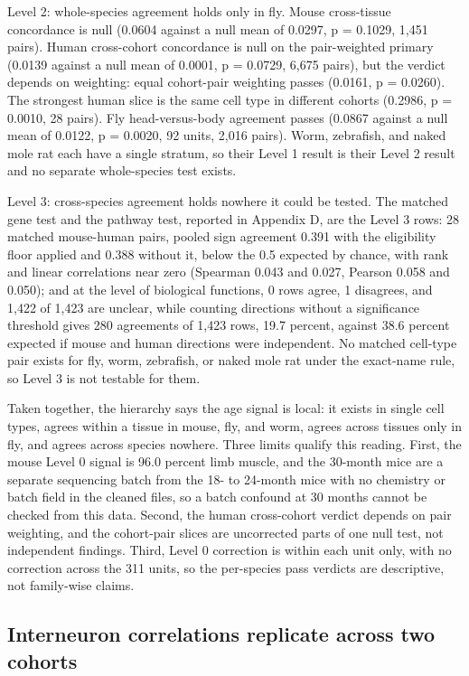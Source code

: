\documentclass[11pt]{article}
\begin{document}
Level 2: whole-species agreement holds only in fly. Mouse cross-tissue concordance is null (0.0604 against a null mean of 0.0297, p = 0.1029, 1,451 pairs). Human cross-cohort concordance is null on the pair-weighted primary (0.0139 against a null mean of 0.0001, p = 0.0729, 6,675 pairs), but the verdict depends on weighting: equal cohort-pair weighting passes (0.0161, p = 0.0260). The strongest human slice is the same cell type in different cohorts (0.2986, p = 0.0010, 28 pairs). Fly head-versus-body agreement passes (0.0867 against a null mean of 0.0122, p = 0.0020, 92 units, 2,016 pairs). Worm, zebrafish, and naked mole rat each have a single stratum, so their Level 1 result is their Level 2 result and no separate whole-species test exists.

Level 3: cross-species agreement holds nowhere it could be tested. The matched gene test and the pathway test, reported in Appendix D, are the Level 3 rows: 28 matched mouse-human pairs, pooled sign agreement 0.391 with the eligibility floor applied and 0.388 without it, below the 0.5 expected by chance, with rank and linear correlations near zero (Spearman 0.043 and 0.027, Pearson 0.058 and 0.050); and at the level of biological functions, 0 rows agree, 1 disagrees, and 1,422 of 1,423 are unclear, while counting directions without a significance threshold gives 280 agreements of 1,423 rows, 19.7 percent, against 38.6 percent expected if mouse and human directions were independent. No matched cell-type pair exists for fly, worm, zebrafish, or naked mole rat under the exact-name rule, so Level 3 is not testable for them.

Taken together, the hierarchy says the age signal is local: it exists in single cell types, agrees within a tissue in mouse, fly, and worm, agrees across tissues only in fly, and agrees across species nowhere. Three limits qualify this reading. First, the mouse Level 0 signal is 96.0 percent limb muscle, and the 30-month mice are a separate sequencing batch from the 18- to 24-month mice with no chemistry or batch field in the cleaned files, so a batch confound at 30 months cannot be checked from this data. Second, the human cross-cohort verdict depends on pair weighting, and the cohort-pair slices are uncorrected parts of one null test, not independent findings. Third, Level 0 correction is within each unit only, with no correction across the 311 units, so the per-species pass verdicts are descriptive, not family-wise claims.

\subsection*{Interneuron correlations replicate across two cohorts}
\end{document}
